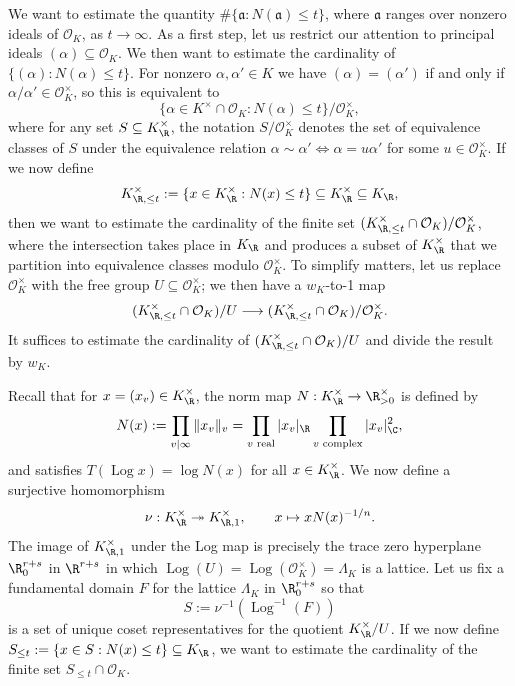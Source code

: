 We want to estimate the quantity $\#\{\mathfrak a:N(\mathfrak a)\leq t\}$, where $\mathfrak a$ ranges over nonzero ideals of $\mathcal O_K$, as $t\to\infty$. As a first step, let us restrict our attention to principal ideals $(\alpha)\subseteq\mathcal O_K$. We then want to estimate the cardinality of $\{(\alpha):N(\alpha)\leq t\}$. For nonzero $\alpha,\alpha'\in K$ we have $(\alpha)=(\alpha')$ if and only if $\alpha/\alpha'\in\mathcal O_K^\times$, so this is equivalent to
\[
\{\alpha\in K^\times\cap\mathcal O_K:N(\alpha)\leq t\}/\mathcal O_K^\times,
\]
where for any set $S\subseteq K_\R^\times$, the notation $S/\mathcal O_K^\times$ denotes the set of equivalence classes of $S$ under the equivalence relation $\alpha\sim\alpha'\Leftrightarrow\alpha=u\alpha'$ for some $u\in\mathcal O_K^\times$. If we now define
\[
K_{\R,\leq t}^\times:=\{x\in K_\R^\times:N(x)\leq t\}\subseteq K_\R^\times\subseteq K_\R,
\]
then we want to estimate the cardinality of the finite set $(K_{\R,\leq t}^\times\cap\mathcal O_K)/\mathcal O_K^\times$, where the intersection takes place in $K_\R$ and produces a subset of $K_\R^\times$ that we partition into equivalence classes modulo $\mathcal O_K^\times$. To simplify matters, let us replace $\mathcal O_K^\times$ with the free group $U\subseteq\mathcal O_K^\times$; we then have a $w_K$-to-1 map
\[
(K_{\R,\leq t}^\times\cap\mathcal O_K)/U\longrightarrow(K_{\R,\leq t}^\times\cap\mathcal O_K)/\mathcal O_K^\times.
\]
It suffices to estimate the cardinality of $(K_{\R,\leq t}^\times\cap\mathcal O_K)/U$ and divide the result by $w_K$.

Recall that for $x=(x_v)\in K_\R^\times$, the norm map $N:K_\R^\times\to\R_{>0}^\times$ is defined by
\[
N(x):=\prod_{v\mid\infty}\|x_v\|_v=\prod_{v\text{ real}}|x_v|_\R\prod_{v\text{ complex}}|x_v|_\C^2,
\]
and satisfies $T(\operatorname{Log}x)=\log N(x)$ for all $x\in K_\R^\times$. We now define a surjective homomorphism
\[
\nu:K_\R^\times\twoheadrightarrow K_{\R,1}^\times,\qquad x\mapsto xN(x)^{-1/n}.
\]
The image of $K_{\R,1}^\times$ under the Log map is precisely the trace zero hyperplane $\R^{r+s}_0$ in $\R^{r+s}$ in which $\operatorname{Log}(U)=\operatorname{Log}(\mathcal O_K^\times)=\Lambda_K$ is a lattice. Let us fix a fundamental domain $F$ for the lattice $\Lambda_K$ in $\R^{r+s}_0$ so that
\[
S:=\nu^{-1}(\operatorname{Log}^{-1}(F))
\]
is a set of unique coset representatives for the quotient $K_\R^\times/U$. If we now define $S_{\leq t}:=\{x\in S:N(x)\leq t\}\subseteq K_\R$, we want to estimate the cardinality of the finite set $S_{\leq t}\cap\mathcal O_K$.

